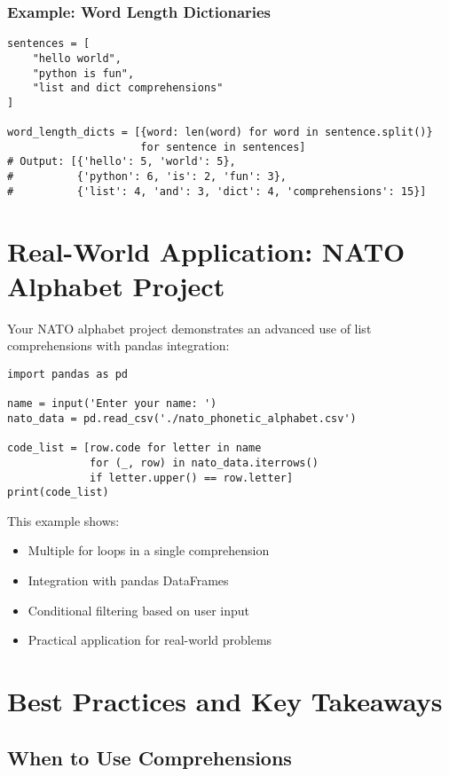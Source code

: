 \documentclass[12pt,a4paper]{article}
\begin{document}
\subsubsection{Example: Word Length Dictionaries}
\begin{lstlisting}
sentences = [
    "hello world",
    "python is fun",
    "list and dict comprehensions"
]

word_length_dicts = [{word: len(word) for word in sentence.split()} 
                     for sentence in sentences]
# Output: [{'hello': 5, 'world': 5}, 
#          {'python': 6, 'is': 2, 'fun': 3}, 
#          {'list': 4, 'and': 3, 'dict': 4, 'comprehensions': 15}]
\end{lstlisting}

\section{Real-World Application: NATO Alphabet Project}

Your NATO alphabet project demonstrates an advanced use of list comprehensions with pandas integration:

\begin{lstlisting}
import pandas as pd

name = input('Enter your name: ')
nato_data = pd.read_csv('./nato_phonetic_alphabet.csv')

code_list = [row.code for letter in name 
             for (_, row) in nato_data.iterrows() 
             if letter.upper() == row.letter]
print(code_list)
\end{lstlisting}

This example shows:
\begin{itemize}
    \item Multiple for loops in a single comprehension
    \item Integration with pandas DataFrames
    \item Conditional filtering based on user input
    \item Practical application for real-world problems
\end{itemize}

\section{Best Practices and Key Takeaways}

\subsection{When to Use Comprehensions}
\end{document}

